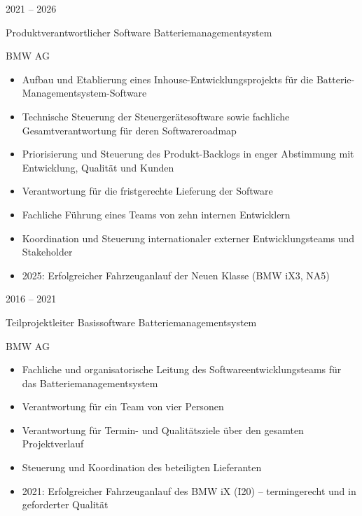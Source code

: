 \documentclass[a4paper,10pt]{article}
\newlength{\cvcolumngapwidth}
\newlength{\cvleftcolumnwidth}
\newlength{\cvrightcolumnwidth}
\newcommand{\cvtitlestyle}[1]{{\large\cvtitlefont\textcolor{cvtitlecolor}{#1}}}
\newcommand{\cvdurationstyle}[1]{{\small\cvdurationfont\textcolor{cvdurationcolor}{#1}}}
\newlength{\cvafteritemskipamount}
\newlength{\cvaftertitleskipamount}
\newlength{\cvparskip}
\newcommand{\cvitem}[2]{
    \begin{minipage}[t]{\cvleftcolumnwidth}
        \raggedleft #1
    \end{minipage}%
    \hspace{\cvcolumngapwidth}%
    \begin{minipage}[t]{\cvrightcolumnwidth}
        \setlength{\parskip}{\cvparskip} #2
    \end{minipage}

    \vspace{\cvafteritemskipamount}
}
\newcommand{\cvtitle}[1]{
    \cvtitlestyle{#1}

    \vspace{\cvaftertitleskipamount}
    \vspace{-\cvparskip}
}
\begin{document}
\cvitem{
    \cvdurationstyle{2021 -- 2026}
}{
    \cvtitle{Produktverantwortlicher Software Batteriemanagementsystem}

    BMW AG

    \begin{itemize}[leftmargin=*]
        \item Aufbau und Etablierung eines Inhouse-Entwicklungsprojekts für die Batterie-Managementsystem-Software
        \item Technische Steuerung der Steuergerätesoftware sowie fachliche Gesamtverantwortung für deren Softwareroadmap
        \item Priorisierung und Steuerung des Produkt-Backlogs in enger Abstimmung mit Entwicklung, Qualität und Kunden
        \item Verantwortung für die fristgerechte Lieferung der Software
        \item Fachliche Führung eines Teams von zehn internen Entwicklern
        \item Koordination und Steuerung internationaler externer Entwicklungsteams und Stakeholder
        \item 2025: Erfolgreicher Fahrzeuganlauf der Neuen Klasse (BMW iX3, NA5)
    \end{itemize}
}

\cvitem{
    \cvdurationstyle{2016 -- 2021}
}{
    \cvtitle{Teilprojektleiter Basissoftware Batteriemanagementsystem}

    BMW AG

    \begin{itemize}[leftmargin=*]
        \item Fachliche und organisatorische Leitung des Softwareentwicklungsteams für das Batteriemanagementsystem
        \item Verantwortung für ein Team von vier Personen
        \item Verantwortung für Termin- und Qualitätsziele über den gesamten Projektverlauf
        \item Steuerung und Koordination des beteiligten Lieferanten
        \item 2021: Erfolgreicher Fahrzeuganlauf des BMW iX (I20) -- termingerecht und in geforderter Qualität
    \end{itemize}
}
\end{document}
